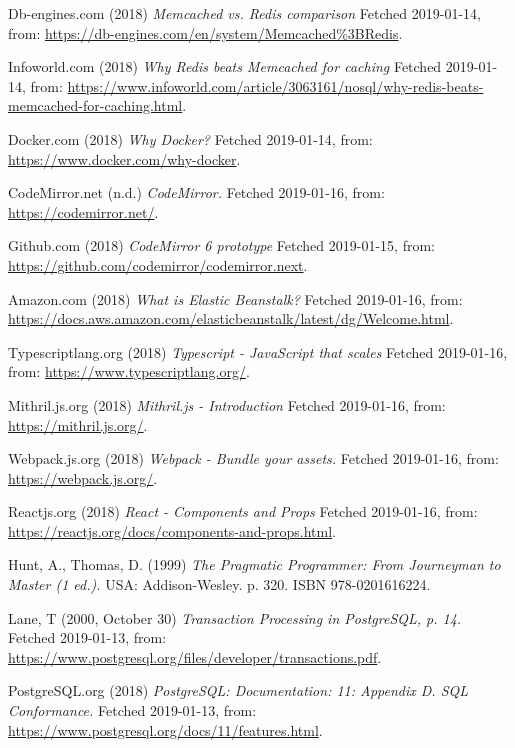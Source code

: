 \documentclass[12pt,a4paper]{report}
\begin{document}
{\begin{thebibliography}{1}
Db-engines.com (2018) {\em Memcached vs. Redis comparison} Fetched 2019-01-14, from: \url{https://db-engines.com/en/system/Memcached\%3BRedis}.

Infoworld.com (2018) {\em Why Redis beats Memcached for caching} Fetched 2019-01-14, from: \url{https://www.infoworld.com/article/3063161/nosql/why-redis-beats-memcached-for-caching.html}.

Docker.com (2018) {\em Why Docker?} Fetched 2019-01-14, from: \url{https://www.docker.com/why-docker}.

 CodeMirror.net (n.d.) {\em CodeMirror.} Fetched 2019-01-16, from: \url{https://codemirror.net/}.

Github.com (2018) {\em CodeMirror 6 prototype} Fetched 2019-01-15, from: \url{https://github.com/codemirror/codemirror.next}.

Amazon.com (2018) {\em What is Elastic Beanstalk?} Fetched 2019-01-16, from: \url{https://docs.aws.amazon.com/elasticbeanstalk/latest/dg/Welcome.html}.

Typescriptlang.org (2018) {\em Typescript - JavaScript that scales} Fetched 2019-01-16, from: \url{https://www.typescriptlang.org/}.

Mithril.js.org (2018) {\em Mithril.js - Introduction} Fetched 2019-01-16, from: \url{https://mithril.js.org/}.

Webpack.js.org (2018) {\em Webpack - Bundle your assets.} Fetched 2019-01-16, from: \url{https://webpack.js.org/}.

Reactjs.org (2018) {\em React - Components and Props} Fetched 2019-01-16, from: \url{https://reactjs.org/docs/components-and-props.html}.

 Hunt, A., Thomas, D. (1999) {\em The Pragmatic Programmer: From Journeyman to Master (1 ed.).} USA: Addison-Wesley. p. 320. ISBN 978-0201616224.

Lane, T (2000, October 30) {\em Transaction Processing in PostgreSQL, p. 14.} Fetched 2019-01-13, from: \url{https://www.postgresql.org/files/developer/transactions.pdf}.

PostgreSQL.org (2018) {\em PostgreSQL: Documentation: 11: Appendix D. SQL Conformance.} Fetched 2019-01-13, from: \url{https://www.postgresql.org/docs/11/features.html}.


\end{thebibliography}}
\end{document}

